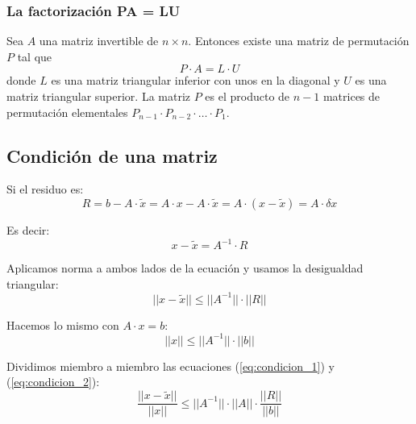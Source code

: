 \documentclass[../main.tex]{subfiles}
\begin{document}
        \subsubsection{La factorización PA = LU}
            \begin{teorema}
                Sea $A$ una matriz invertible de $n \times n$. Entonces existe una matriz de permutación $P$ tal que
                \begin{equation}
                    P \cdot A = L \cdot U
                \end{equation}
                donde $L$ es una matriz triangular inferior con unos en la diagonal y $U$ es una matriz triangular superior. La matriz $P$ es el producto de $n-1$ matrices de permutación elementales $P_{n-1} \cdot P_{n-2} \cdot \dots \cdot P_1$.   
            \end{teorema}
            
        
    \subsection{Condición de una matriz}
        Si el residuo es:
        \begin{equation}
            R = b - A \cdot \widetilde{x} = A \cdot x - A \cdot \widetilde{x} = A \cdot (x - \widetilde{x}) = A \cdot \delta x
        \end{equation}
        
        Es decir:
        \begin{equation}
            x - \widetilde{x} = A^{-1} \cdot R
        \end{equation}

        Aplicamos norma a ambos lados de la ecuación y usamos la desigualdad triangular:
        \begin{equation}
            ||x - \widetilde{x}|| \leq ||A^{-1}|| \cdot ||R||
            \label{eq:condicion_1}
        \end{equation}

        Hacemos lo mismo con $A \cdot  x = b$:
        \begin{equation}
            ||x|| \leq ||A^{-1}|| \cdot ||b||
            \label{eq:condicion_2}
        \end{equation}

        Dividimos miembro a miembro las ecuaciones (\ref{eq:condicion_1}) y (\ref{eq:condicion_2}):
        \begin{equation}
            \frac{||x - \widetilde{x}||}{||x||} \leq ||A^{-1}|| \cdot ||A|| \cdot \frac{||R||}{||b||}
        \end{equation}
\end{document}
